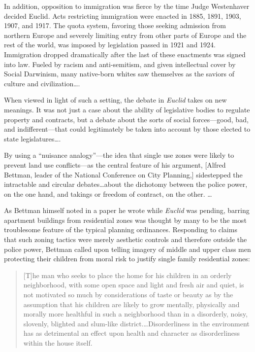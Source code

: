 In addition, opposition to immigration was fierce by the time Judge Westenhaver
decided Euclid. Acts restricting immigration were enacted in 1885, 1891, 1903,
1907, and 1917. The quota system, favoring those seeking admission from
northern Europe and severely limiting entry from other parts of Europe and the
rest of the world, was imposed by legislation passed in 1921 and 1924.
Immigration dropped dramatically after the last of these enactments was signed
into law. Fueled by racism and anti-semitism, and given intellectual cover by
Social Darwinism, many native-born whites saw themselves as the saviors of
culture and civilization\ldots .

When viewed in light of such a setting, the debate in \textit{Euclid} takes on
new meanings. It was not just a case about the ability of legislative bodies to
regulate property and contracts, but a debate about the sorts of social
forces---good, bad, and indifferent---that could legitimately be taken into
account by those elected to state legislatures\ldots .

By using a ``nuisance analogy''---the idea that single use zones were likely to
prevent land use conflicts---as the central feature of his argument, [Alfred
Bettman, leader of the National Conference on City Planning,] sidestepped the
intractable and circular debates\ldots about the dichotomy between the police
power, on the one hand, and takings or freedom of contract, on the other. \ldots

As Bettman himself noted in a paper he wrote while \textit{Euclid} was pending,
barring apartment buildings from residential zones was thought by many to be the
most troublesome feature of the typical planning ordinances. Responding to
claims that such zoning tactics were merely aesthetic controls and therefore
outside the police power, Bettman called upon telling imagery of middle and
upper class men protecting their children from moral risk to justify single
family residential zones:
\begin{quote}
[T]he man who seeks to place the home for his children in an orderly
neighborhood, with some open space and light and fresh air and quiet, is not
motivated so much by considerations of taste or beauty as by the assumption that
his children are likely to grow mentally, physically and morally more healthful
in such a neighborhood than in a disorderly, noisy, slovenly, blighted and
slum-like district.\ldots Disorderliness in the environment has as detrimental
an effect upon health and character as disorderliness within the house itself.
\end{quote}

